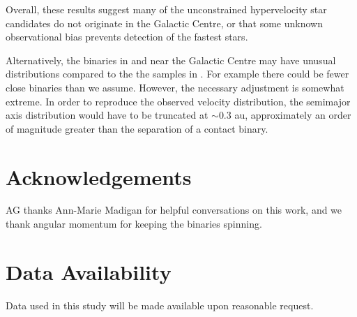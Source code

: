\documentclass[fleqn,usenatbib]{mnras}
\begin{document}
Overall, these results suggest many of the unconstrained hypervelocity star candidates do not originate in the Galactic Centre, or that some unknown observational bias prevents detection of the fastest stars. 

Alternatively, the binaries in and near the Galactic Centre may have unusual distributions compared to the the samples in \citet{moe+2017}. For example there could be fewer close binaries than we assume.  However, the necessary adjustment is somewhat extreme. In order to reproduce the observed velocity distribution,  the semimajor axis distribution would have to be truncated at $\sim 0.3$ au, approximately an order of magnitude greater than the separation of a contact binary. 

\section*{Acknowledgements}
AG thanks Ann-Marie Madigan for helpful conversations on this work, and we thank angular momentum for keeping the binaries spinning.


\section*{Data Availability}

Data used in this study will be made available upon reasonable request.








\end{document}
